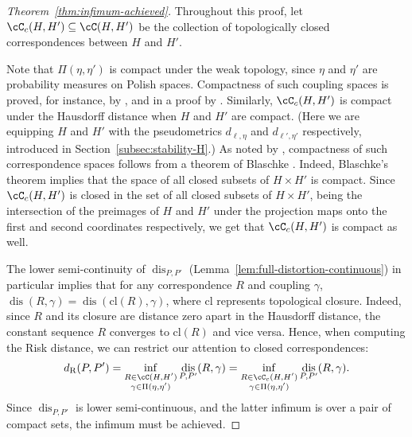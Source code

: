 \documentclass[twoside,11pt]{article}
\newcommand{\dexp}[1][]{d_{\mathrm{R}#1}}
\DeclareMathOperator{\dis}{dis}
\begin{document}
    \begin{proof}[Theorem~\ref{thm:infimum-achieved}]
        Throughout this proof, let $\cC_c(H,H')\subseteq \cC(H,H')$ be the collection of topologically closed correspondences between $H$ and $H'$.
        
        Note that $\Pi(\eta,\eta')$ is compact under the weak topology, since $\eta$ and $\eta'$ are probability measures on Polish spaces. Compactness of such coupling spaces is proved, for instance, by \citet[Lemma 1.2]{sturm_space_2012}, \citet[Lemma 2.2]{chowdhury_gromovwasserstein_2019} and in a proof by \citet[Prop 2.1]{villani_topics_2003}. Similarly, $\cC_c(H,H')$ is compact under the Hausdorff distance when $H$ and $H'$ are compact. (Here we are equipping $H$ and $H'$ with the pseudometrics $d_{\ell,\eta}$ and $d_{\ell',\eta'}$ respectively, introduced in Section~\ref{subsec:stability-H}.) As noted by \citet[Section 2]{chowdhury_explicit_2018}, compactness of such correspondence spaces follows from a theorem of Blaschke \citep[Theorem 7.3.8]{BBI}. Indeed, Blaschke's theorem implies that the space of all closed subsets of $H\times H'$ is compact. Since $\cC_c(H,H')$ is closed in the set of all closed subsets of $H\times H'$, being the intersection of the preimages of $H$ and $H'$ under the projection maps onto the first and second coordinates respectively, we get that $\cC_c(H,H')$ is compact as well.

        The lower semi-continuity of $\dis_{P,P'}$ (Lemma~\ref{lem:full-distortion-continuous}) in particular implies that for any correspondence $R$ and coupling $\gamma$, $\dis(R,\gamma) = \dis(\mathrm{cl}(R),\gamma)$, where $\mathrm{cl}$ represents topological closure. Indeed, since $R$ and its closure are distance zero apart in the Hausdorff distance, the constant sequence $R$ converges to $\mathrm{cl}(R)$ and vice versa. Hence, when computing the Risk distance, we can restrict our attention to closed correspondences:
        \[\dexp(P,P') = \inf_{\substack{R\in \cC(H,H')\\\gamma\in \Pi(\eta,\eta')}}\dis_{P,P'}(R,\gamma) = \inf_{\substack{R\in \cC_c(H,H')\\\gamma\in \Pi(\eta,\eta')}}\dis_{P,P'}(R,\gamma).\]
        Since $\dis_{P,P'}$ is lower semi-continuous, and the latter infimum is over a pair of compact sets, the infimum must be achieved.
    \end{proof}
\end{document}
